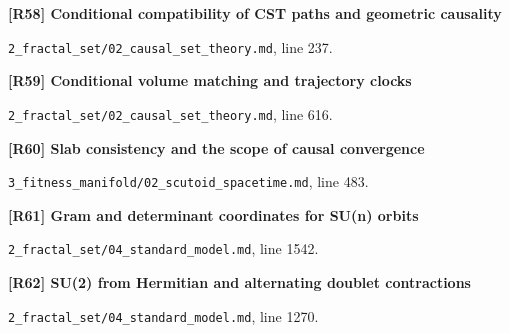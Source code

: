 \documentclass[11pt,a4paper]{article}
\begin{document}
\par\medskip\noindent\begin{minipage}{\linewidth}\textbf{[R58] Conditional compatibility of CST paths and geometric causality}\label{src:prop-fractal-causal-order-equivalence}\par
{\small\texttt{}\par
\nolinkurl{2_fractal_set/02_causal_set_theory.md}, line 237.\par}
\end{minipage}\par

\par\medskip\noindent\begin{minipage}{\linewidth}\textbf{[R59] Conditional volume matching and trajectory clocks}\label{src:thm-fractal-faithful-embedding}\par
{\small\texttt{}\par
\nolinkurl{2_fractal_set/02_causal_set_theory.md}, line 616.\par}
\end{minipage}\par

\par\medskip\noindent\begin{minipage}{\linewidth}\textbf{[R60] Slab consistency and the scope of causal convergence}\label{src:prop-scutoid-cst-compatibility}\par
{\small\texttt{}\par
\nolinkurl{3_fitness_manifold/02_scutoid_spacetime.md}, line 483.\par}
\end{minipage}\par

\par\medskip\noindent\begin{minipage}{\linewidth}\textbf{[R61] Gram and determinant coordinates for SU(n) orbits}\label{src:thm-sm-direct-orbit-isomorphism}\par
{\small\texttt{}\par
\nolinkurl{2_fractal_set/04_standard_model.md}, line 1542.\par}
\end{minipage}\par

\par\medskip\noindent\begin{minipage}{\linewidth}\textbf{[R62] SU(2) from Hermitian and alternating doublet contractions}\label{src:thm-sm-direct-su2-invariants}\par
{\small\texttt{}\par
\nolinkurl{2_fractal_set/04_standard_model.md}, line 1270.\par}
\end{minipage}\par
\end{document}
